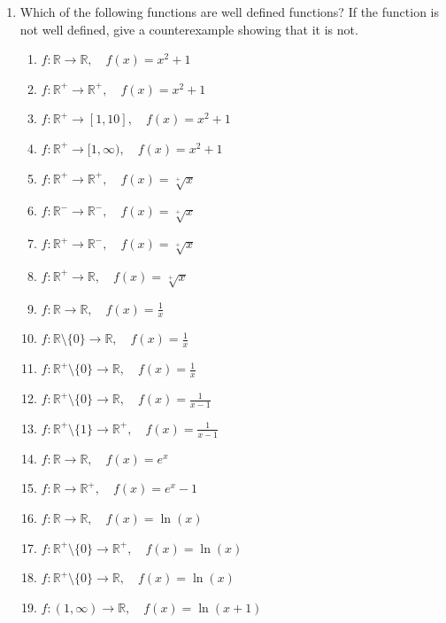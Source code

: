 \documentclass[11pt,a4paper,titlepage,oneside,openany]{article}
\numberwithin{equation}{section}
\numberwithin{algorithm}{section}
\numberwithin{figure}{section}
\numberwithin{table}{section}
\newcommand{\mb}{\mathbb}
\begin{document}
\begin{enumerate}
\item Which of the following functions are well defined functions? If the function is not well defined, give a counterexample showing that it is not.
  \begin{multicols}{2}
    \begin{enumerate}
    \item $f: \mb{R} \to \mb{R},\quad f(x)=x^2+1$
    \item $f: \mb{R}^+ \to \mb{R}^+,\quad f(x)=x^2+1$
    \item $f: \mb{R}^+ \to [1,10],\quad f(x)=x^2+1$
    \item $f: \mb{R}^+ \to [1,\infty),\quad f(x)=x^2+1$
    \item $f: \mb{R}^+ \to \mb{R}^+,\quad f(x)=\sqrt[+]{x}$
    \item $f: \mb{R}^- \to \mb{R}^-,\quad f(x)=\sqrt[+]{x}$
    \item $f: \mb{R}^+ \to \mb{R}^-,\quad f(x)=\sqrt[+]{x}$
    \item $f: \mb{R}^+ \to \mb{R},\quad f(x)=\sqrt[+]{x}$
    \item $f: \mb{R} \to \mb{R},\quad f(x)=\frac{1}{x}$
    \item $f: \mb{R}\setminus\{0\} \to \mb{R},\quad f(x)=\frac{1}{x}$
    \item $f: \mb{R}^+\setminus\{0\} \to \mb{R},\quad f(x)=\frac{1}{x}$
    \item $f: \mb{R}^+\setminus\{0\} \to \mb{R},\quad f(x)=\frac{1}{x-1}$
    \item $f: \mb{R}^+\setminus\{1\} \to \mb{R}^+,\quad f(x)=\frac{1}{x-1}$
    \item $f: \mb{R} \to \mb{R},\quad f(x)=e^x$
    \item $f: \mb{R} \to \mb{R}^+,\quad f(x)=e^x-1$
    \item $f: \mb{R} \to \mb{R},\quad f(x)=\ln(x)$
    \item $f: \mb{R}^+\setminus \{0\} \to \mb{R}^+,\quad f(x)=\ln(x)$
    \item $f: \mb{R}^+\setminus \{0\} \to \mb{R},\quad f(x)=\ln(x)$
    \item $f: (1,\infty) \to \mb{R},\quad f(x)=\ln(x+1)$
    \end{enumerate}
  \end{multicols}


\end{enumerate}
\end{document}
